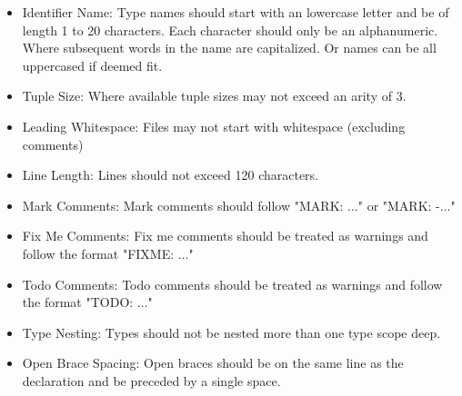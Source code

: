 \documentclass[12pt]{article}
\begin{document}
\begin{itemize}
     \newline
  \item Identifier Name:\newline
    Type names should start with an lowercase letter and be of length 1 to 20 characters. Each \newline
    character should only be an alphanumeric. Where subsequent words in the name are capitalized. \newline
    Or names can be all uppercased if deemed fit. \newline
     \newline
  \item Tuple Size:\newline
    Where available tuple sizes may not exceed an arity of 3. \newline
     \newline
  \item Leading Whitespace:\newline
    Files may not start with whitespace (excluding comments) \newline
     \newline
  \item Line Length:\newline
    Lines should not exceed 120 characters. \newline
     \newline
  \item Mark Comments:\newline
    Mark comments should follow "MARK: ..." or "MARK: -..." \newline
     \newline
  \item Fix Me Comments:\newline
    Fix me comments should be treated as warnings and follow the format "FIXME: ..." \newline
  \item Todo Comments:\newline
    Todo comments should be treated as warnings and follow the format "TODO: ..." \newline
  \item Type Nesting:\newline
    Types should not be nested more than one type scope deep. \newline
     \newline
  \item Open Brace Spacing:\newline
    Open braces should be on the same line as the declaration and be preceded by a single space. \newline

\end{itemize}
\end{document}
